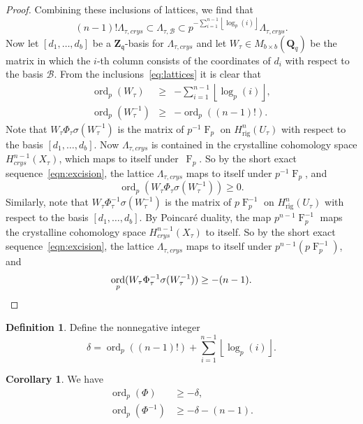 \documentclass[a4paper,11pt]{article}
\numberwithin{equation}{section}
\providecommand{\floor}[1]{\left\lfloor#1\right\rfloor}   %
\newcommand{\ZZ}{\mathbf{Z}} %
\newcommand{\QQ}{\mathbf{Q}} %
\DeclareMathOperator{\ord}{ord}          %
\DeclareMathOperator{\Frob}{F}           %
\providecommand{\Hrig}{H_{\text{rig}}}  %
\providecommand{\cB}{\mathcal{B}} %
\theoremstyle{definition}
\newtheorem{cor}[thm]{Corollary}
\newtheorem{defn}[thm]{Definition}
\begin{document}
\begin{proof}
Combining these inclusions of lattices, we find that
\begin{equation} \label{eq:lattices}
(n-1)! \Lambda_{\tau,crys} \subset \Lambda_{\tau,\cB} \subset p^{-\sum_{i=1}^{n-1} \floor{\log_p(i)}} \Lambda_{\tau,crys}.
\end{equation}
Now let $[d_1, \dotsc, d_b]$ be a $\ZZ_{\mathfrak{q}}$-basis for 
$\Lambda_{\tau,crys}$ and let $W_{\tau} \in M_{b \times b}(\QQ_q)$ be 
the matrix in which the $i$-th column 
consists of the coordinates of $d_i$ with respect to the basis $\cB$. From the 
inclusions~\eqref{eq:lattices} it is clear that 
\begin{eqnarray*}
\ord_p(W_{\tau}) &\geq& -\sum_{i=1}^{n-1} \floor{\log_p(i)}, \\
\ord_p(W_{\tau}^{-1}) &\geq& -\ord_p((n-1)!).
\end{eqnarray*}
Note that $W_{\tau} \Phi_{\tau} \sigma(W_{\tau}^{-1})$ is the matrix of 
$p^{-1}\Frob_{p}$ on $\Hrig^n(U_{\tau})$ with respect to the basis 
$[d_1,\dotsc,d_b]$. Now $\Lambda_{\tau,crys}$ is contained in the crystalline 
cohomology space $H^{n-1}_{crys}(X_{\tau})$, which maps to itself 
under~$\Frob_p$. So by the short exact sequence~\eqref{eqn:excision}, the 
lattice $\Lambda_{\tau,crys}$ maps to itself under $p^{-1}\Frob_{p}$, and
\[
\ord_p(W_{\tau} \Phi_{\tau} \sigma(W_{\tau}^{-1})) \geq 0.
\]
Similarly, note that $W_{\tau} \Phi_{\tau}^{-1} \sigma(W_{\tau}^{-1})$ is 
the matrix of $p\Frob_p^{-1}$ on $\Hrig^n(U_{\tau})$ with respect to the 
basis $[d_1,\dotsc,d_b]$. By Poincar\'e duality, the map $p^{n-1}\Frob_p^{-1}$ 
maps the crystalline cohomology space $H^{n-1}_{crys}(X_{\tau})$ to itself. 
So by the short exact sequence~\eqref{eqn:excision}, the lattice 
$\Lambda_{\tau,crys}$ maps to itself under $p^{n-1} (p\Frob_p^{-1})$, and 
\begin{equation*}
\ord_p(W_{\tau} \Phi_{\tau}^{-1} \sigma(W_{\tau}^{-1})) \geq -(n-1). \qedhere
\end{equation*}
\end{proof}

\begin{defn} \label{defn:delta}
Define the nonnegative integer
\[
\delta = \ord_p((n-1)!)+\sum_{i=1}^{n-1} \floor{\log_p(i)}.
\]
\end{defn}

\begin{cor} \label{cor:delta} We have 
\begin{align*}
\ord_p(\Phi) &\geq -\delta, \\
\ord_p(\Phi^{-1}) &\geq -\delta-(n-1).
\end{align*}
\end{cor}
\end{document}
